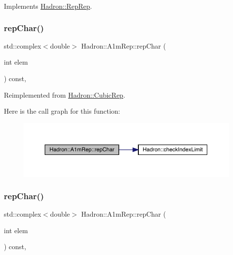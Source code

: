 Implements \mbox{\hyperlink{structHadron_1_1RepRep_ab3213025f6de249f7095892109575fde}{Hadron\+::\+Rep\+Rep}}.

\mbox{\label{structHadron_1_1A1mRep_aae7d6e39a56f0cfd67cb66ad8e1f2f56}} 
\subsubsection{\texorpdfstring{repChar()}{repChar()}\hspace{0.1cm}{\footnotesize\ttfamily [1/3]}}
{\footnotesize\ttfamily std\+::complex$<$double$>$ Hadron\+::\+A1m\+Rep\+::rep\+Char (\begin{DoxyParamCaption}\item[{int}]{elem }\end{DoxyParamCaption}) const\hspace{0.3cm}{\ttfamily [inline]}, {\ttfamily [virtual]}}



Reimplemented from \mbox{\hyperlink{structHadron_1_1CubicRep_af45227106e8e715e84b0af69cd3b36f8}{Hadron\+::\+Cubic\+Rep}}.

Here is the call graph for this function\+:
\nopagebreak
\begin{figure}[H]
\begin{center}
\leavevmode
\includegraphics[width=350pt]{d3/dab/structHadron_1_1A1mRep_aae7d6e39a56f0cfd67cb66ad8e1f2f56_cgraph}
\end{center}
\end{figure}
\mbox{\label{structHadron_1_1A1mRep_aae7d6e39a56f0cfd67cb66ad8e1f2f56}} 
\subsubsection{\texorpdfstring{repChar()}{repChar()}\hspace{0.1cm}{\footnotesize\ttfamily [2/3]}}
{\footnotesize\ttfamily std\+::complex$<$double$>$ Hadron\+::\+A1m\+Rep\+::rep\+Char (\begin{DoxyParamCaption}\item[{int}]{elem }\end{DoxyParamCaption}) const\hspace{0.3cm}{\ttfamily [inline]}, {\ttfamily [virtual]}}




